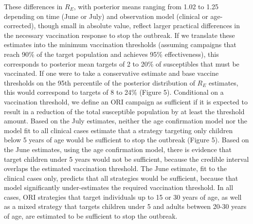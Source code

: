 These differences in $R_E$, with posterior means ranging from 1.02 to 1.25 depending on time (June or July) and observation model (clinical or age-corrected), though small in absolute value, reflect larger practical differences in the necessary vaccination response to stop the outbreak. If we translate these estimates into the minimum vaccination thresholds (assuming campaigns that reach 90\% of the target population and achieves 95\% effectiveness), this corresponds to posterior mean targets of 2 to 20\% of susceptibles that must be vaccinated. If one were to take a conservative estimate and base vaccine thresholds on the 95th percentile of the posterior distribution of $R_E$ estimates, this would correspond to targets of
8 to 24\% (Figure 5). Conditional on a vaccination threshold, we define an ORI campaign as sufficient if it is expected to result in a reduction of
the total susceptible population by at least the threshold amount. Based on the July estimates, neither the age confirmation model nor the model fit
to all clinical cases estimate that a strategy targeting only children below 5 years of age would be sufficient to stop the outbreak
(Figure 5). Based on the June estimates, using the age confirmation model, there is evidence that target children under 5 years would not be
sufficient, because the credible interval overlaps the estimated vaccination threshold. The June estimate, fit to the clinical cases only, predicts
that all strategies would be sufficient, because that model significantly under-estimates the required vaccination threshold. In all cases, ORI strategies that target individuals up to 15 or 30 years of age, as well as a mixed strategy that targets children under 5 and adults between 20-30 years of age, are estimated to be sufficient to stop the outbreak.